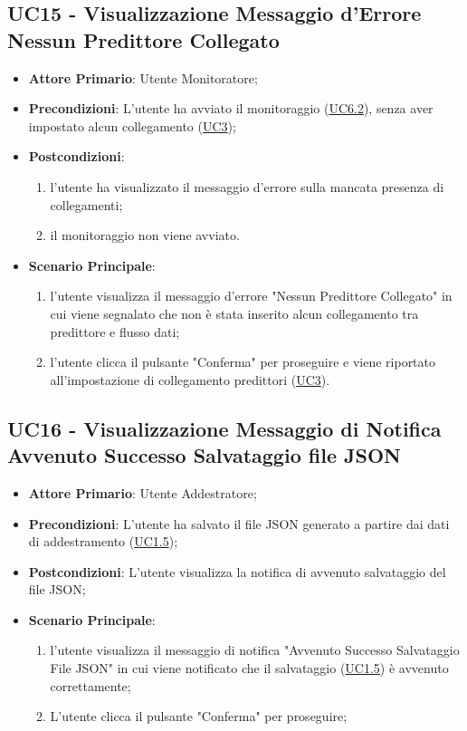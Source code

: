 	\subsection{UC15 - Visualizzazione Messaggio d'Errore Nessun Predittore Collegato}
		\begin{itemize}
			\item\textbf{Attore Primario}: Utente Monitoratore;
			\item\textbf{Precondizioni}: L’utente ha avviato il monitoraggio (\hyperref[par:UC6.2]{UC6.2}), senza aver impostato alcun collegamento (\hyperref[par:UC3]{UC3});
			\item\textbf{Postcondizioni}: 
				\begin{enumerate}
					\item l’utente ha visualizzato il messaggio d'errore sulla mancata presenza di collegamenti;	
					\item	il monitoraggio non viene avviato.
				\end{enumerate}
			\item\textbf{Scenario Principale}: 
				\begin{enumerate} 
					\item l’utente visualizza il messaggio d'errore "Nessun Predittore Collegato" in cui viene segnalato che non è stata inserito alcun collegamento tra predittore e flusso dati; 
					\item l'utente clicca il pulsante "Conferma" per proseguire e viene riportato all'impostazione di collegamento predittori (\hyperref[par:UC3]{UC3}).		
				\end{enumerate}		
		\end{itemize}


	\label{par:UC16}
	\subsection{UC16 - Visualizzazione Messaggio di Notifica Avvenuto Successo Salvataggio file JSON}
		\begin{itemize}
			\item\textbf{Attore Primario}: Utente Addestratore;
			\item\textbf{Precondizioni}: L'utente ha salvato il file JSON generato a partire dai dati di addestramento (\hyperref[par:UC1.5]{UC1.5}); 
			\item\textbf{Postcondizioni}: L'utente visualizza la notifica di avvenuto salvataggio del file JSON;					\item\textbf{Scenario Principale}: 
				\begin{enumerate} 
					\item l’utente visualizza il messaggio di notifica "Avvenuto Successo Salvataggio File JSON" in cui viene notificato che il salvataggio (\hyperref[par:UC1.5]{UC1.5}) è avvenuto correttamente;
					\item L'utente clicca il pulsante "Conferma" per proseguire;		
				\end{enumerate}		
		\end{itemize}
	

